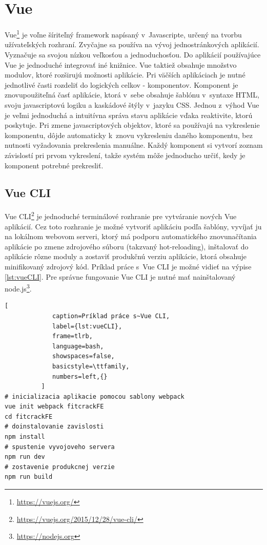 \documentclass[slovak]{fitthesis}
\begin{document}
\section{Vue}\label{vue}
Vue\footnote{\url{https://vuejs.org/}} je voľne šíriteľný framework napísaný v~Javascripte, určený na tvorbu užívateľských rozhraní. Zvyčajne sa používa na vývoj jednostránkových aplikácií. Vyznačuje sa svojou nízkou veľkosťou a jednoduchosťou. Do aplikácií používajúce Vue je jednoduché integrovať iné knižnice. Vue taktiež obsahuje množstvo modulov, ktoré rozširujú možnosti aplikácie. Pri väčších aplikáciach je nutné jednotlivé časti rozdeliť do logických celkov - komponentov. Komponent je znovupoužiteľná časť aplikácie, ktorá v~sebe obsahuje šablónu v~syntaxe HTML, svoju javascriptovú logiku a kaskádové štýly v~jazyku CSS. Jednou z~výhod Vue je veľmi jednoduchá a intuitívna správa stavu aplikácie vďaka reaktivite, ktorú poskytuje. Pri zmene javascriptových objektov, ktoré sa používajú na vykreslenie komponentu, dôjde automaticky k~znovu vykresleniu daného komponentu, bez nutnosti vyžadovania prekreslenia manuálne. Každý komponent si vytvorí zoznam závislostí pri prvom vykreslení, takže systém môže jednoducho určiť, kedy je komponent potrebné prekresliť.

\subsection{Vue CLI}\label{vueCli}
Vue CLI\footnote{\url{https://vuejs.org/2015/12/28/vue-cli/}} je jednoduché terminálové rozhranie pre vytváranie nových Vue aplikácií. Cez toto rozhranie je možné vytvoriť aplikáciu podľa šablóny, vyvíjať ju na lokálnom webovom serveri, ktorý má podporu automatického znovunačítania aplikácie po zmene zdrojového súboru (takzvaný hot-reloading), inštalovať do aplikácie rôzne moduly a zostaviť produkčnú verziu aplikácie, ktorá obsahuje minifikovaný zdrojový kód. Príklad práce s~Vue CLI je možné vidieť na výpise \ref{lst:vueCLI}. Pre správne fungovanie Vue CLI je nutné mať nainštalovaný node.js\footnote{\url{https://nodejs.org}}.

\begin{lstlisting}[
             caption=Príklad práce s~Vue CLI,
             label={lst:vueCLI},
             frame=tlrb,
             language=bash,
             showspaces=false,
             basicstyle=\ttfamily,
             numbers=left,{}
          ]
# inicializacia aplikacie pomocou sablony webpack
vue init webpack fitcrackFE
cd fitcrackFE
# doinstalovanie zavislosti
npm install
# spustenie vyvojoveho servera
npm run dev
# zostavenie produkcnej verzie
npm run build
\end{lstlisting}
\end{document}
